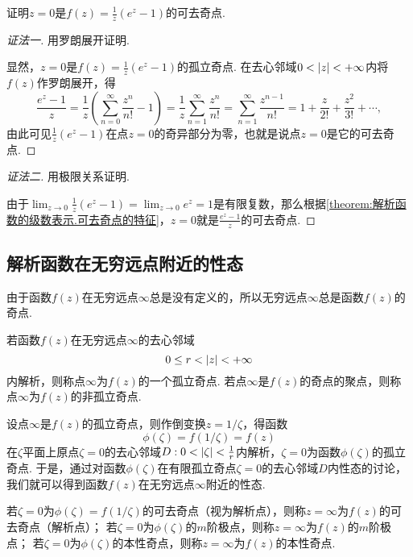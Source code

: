 \begin{example}
证明\(z=0\)是\(f(z) = \frac{1}{z} (e^z-1)\)的可去奇点.
\begin{proof}[证法一]
用罗朗展开证明.

显然，\(z=0\)是\(f(z) = \frac{1}{z} (e^z-1)\)的孤立奇点.
在去心邻域\(0<\abs{z}<+\infty\)内将\(f(z)\)作罗朗展开，得\[
\frac{e^z-1}{z}
= \frac{1}{z} \left( \sum_{n=0}^\infty \frac{z^n}{n!} - 1 \right)
= \frac{1}{z} \sum_{n=1}^\infty \frac{z^n}{n!}
= \sum_{n=1}^\infty \frac{z^{n-1}}{n!}
= 1 + \frac{z}{2!} + \frac{z^2}{3!} + \dotsb,
\]由此可见\(\frac{1}{z} (e^z-1)\)在点\(z=0\)的奇异部分为零，也就是说点\(z=0\)是它的可去奇点.
\end{proof}
\begin{proof}[证法二]
用极限关系证明.

由于\(\lim_{z\to0} \frac{1}{z} (e^z-1) = \lim_{z\to0} e^z = 1\)是有限复数，那么根据\cref{theorem:解析函数的级数表示.可去奇点的特征}，\(z=0\)就是\(\frac{e^z-1}{z}\)的可去奇点.
\end{proof}
\end{example}

\subsection{解析函数在无穷远点附近的性态}
由于函数\(f(z)\)在无穷远点\(\infty\)总是没有定义的，所以无穷远点\(\infty\)总是函数\(f(z)\)的奇点.

\begin{definition}
若函数\(f(z)\)在无穷远点\(\infty\)的去心邻域\[
0 \leq r < \abs{z} < +\infty
\]内解析，则称点\(\infty\)为\(f(z)\)的一个孤立奇点.
若点\(\infty\)是\(f(z)\)的奇点的聚点，则称点\(\infty\)为\(f(z)\)的非孤立奇点.
\end{definition}

设点\(\infty\)是\(f(z)\)的孤立奇点，则作倒变换\(z = 1/\zeta\)，得函数\[
\phi(\zeta) = f(1/\zeta) = f(z)
\]在\(\zeta\)平面上原点\(\zeta=0\)的去心邻域\(D: 0<\abs{\zeta}<\frac{1}{r}\)内解析，\(\zeta=0\)为函数\(\phi(\zeta)\)的孤立奇点.
于是，通过对函数\(\phi(\zeta)\)在有限孤立奇点\(\zeta=0\)的去心邻域\(D\)内性态的讨论，我们就可以得到函数\(f(z)\)在无穷远点\(\infty\)附近的性态.
\begin{definition}\label{definition:解析函数的级数表示.无穷远处孤立奇点的分类}
若\(\zeta=0\)为\(\phi(\zeta)=f(1/\zeta)\)的可去奇点（视为解析点），则称\(z=\infty\)为\(f(z)\)的可去奇点（解析点）；
若\(\zeta=0\)为\(\phi(\zeta)\)的\(m\)阶极点，则称\(z=\infty\)为\(f(z)\)的\(m\)阶极点；
若\(\zeta=0\)为\(\phi(\zeta)\)的本性奇点，则称\(z=\infty\)为\(f(z)\)的本性奇点.
\end{definition}

